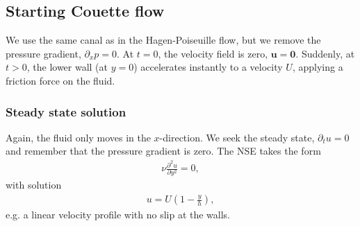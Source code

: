 \documentclass[a4paper,10pt]{article}
\renewcommand{\vec}[1]{\mathbf{#1}}
\renewcommand{\(}{\left(}
\renewcommand{\)}{\right)}
\newcommand{\dpartt}[2]{\frac{\partial^2#1}{\partial#2^2}}
\begin{document}
\subsection{Starting Couette flow}
We use the same canal as in the Hagen-Poiseuille flow, but we remove the pressure gradient, $\partial_x p=0$. At $t=0$, the velocity field is zero, $\vec u = \vec 0$. Suddenly, at $t>0$, the lower wall (at $y=0$) accelerates instantly to a velocity $U$, applying a friction force on the fluid.
\subsubsection{Steady state solution}
Again, the fluid only moves in the $x$-direction. We seek the steady state, $\partial_t u=0$ and remember that the pressure gradient is zero. The NSE takes the form
\begin{align*}
  \nu\dpartt{u}{y} = 0,
\end{align*}
with solution
\begin{align}
  \label{eq:couette_stationary}
  u = U\left(1 - \frac{y}{h}\right),
\end{align}
e.g. a linear velocity profile with no slip at the walls.
\end{document}
